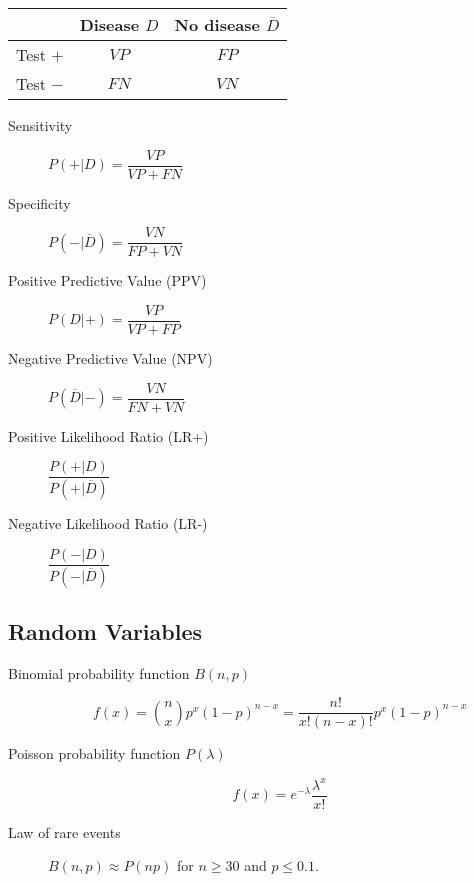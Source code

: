 \begin{multicols*}{2}
\begin{tcolorbox}[hbox, title=Diagnostic tests]
\begin{minipage}{0.4\textwidth}
\begin{center}
\begin{tabular}{|l|c|c|}
\cline{2-3}
\multicolumn{1}{c|}{} & Disease $D$ & No disease $\overline D$ \\
\hline
Test $+$              & $VP$        & $FP$                     \\
\hline
Test $-$              & $FN$        & $VN$                     \\
\hline
\end{tabular}
\end{center}
\begin{description}
\item[Sensitivity] $P(+|D)=\dfrac{VP}{VP+FN}$
\item[Specificity] $P(-|\overline{D})=\dfrac{VN}{FP+VN}$
\item[Positive Predictive Value (PPV)] $P(D|+)=\dfrac{VP}{VP+FP}$
\item[Negative Predictive Value (NPV)] $P(\overline{D}|-)=\dfrac{VN}{FN+VN}$
\item[Positive Likelihood Ratio (LR+)] $\dfrac{P(+|D)}{P(+|\overline{D})}$
\item[Negative Likelihood Ratio (LR-)] $\dfrac{P(-|D)}{P(-|\overline{D})}$
\end{description}
\end{minipage}
\end{tcolorbox}


\subsection*{Random Variables}

\begin{tcolorbox}[hbox, title=Discrete]
\begin{minipage}{0.4\textwidth}
\begin{description}
\item [Binomial probability function $B(n,p)$]
      \[f(x)=\binom{n}{x}p^x (1-p)^{n-x}=\dfrac{n!}{x!(n-x)!}p^x (1-p)^{n-x}\]
\item [Poisson probability function $P(\lambda)$]
      \[f(x)=e^{-\lambda}\frac{\lambda^x}{x!}\]
\item [Law of rare events] $B(n,p)\approx P(np)$ for $n\geq 30$ and $p\leq 0.1$.
\end{description}
\end{minipage}
\end{tcolorbox}


\end{multicols*}
